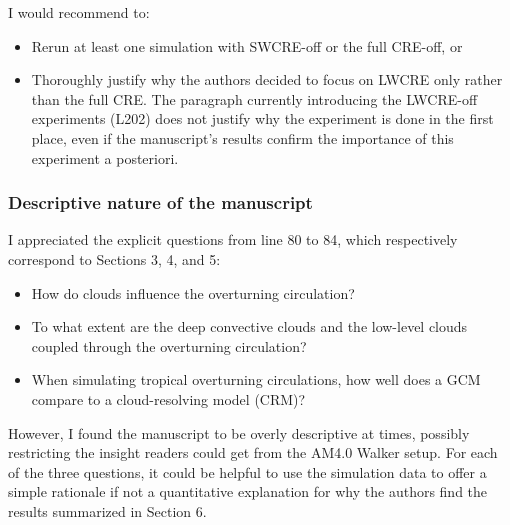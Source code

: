 \documentclass[draft]{agujournal2019}
\begin{document}
I would recommend to:

\begin{itemize}
  \item Rerun at least one simulation with SWCRE-off or the full CRE-off, or
  \item Thoroughly justify why the authors decided to focus on LWCRE only rather than the full CRE. The paragraph
currently introducing the LWCRE-off experiments (L202) does not justify why the experiment is done in the first
place, even if the manuscript’s results confirm the importance of this experiment a posteriori.
\end{itemize}

\subsubsection{Descriptive nature of the manuscript}

I appreciated the explicit questions from line 80 to 84, which respectively correspond to Sections 3, 4, and 5:

\begin{itemize}
  \item How do clouds influence the overturning circulation?
  \item To what extent are the deep convective clouds and the low-level clouds coupled through the overturning circulation?
  \item When simulating tropical overturning circulations, how well does a GCM compare to a cloud-resolving model (CRM)?
\end{itemize}

However, I found the manuscript to be overly descriptive at times, possibly restricting the insight readers could get from
the AM4.0 Walker setup. For each of the three questions, it could be helpful to use the simulation data to offer a simple
rationale if not a quantitative explanation for why the authors find the results summarized in Section 6.
\end{document}
